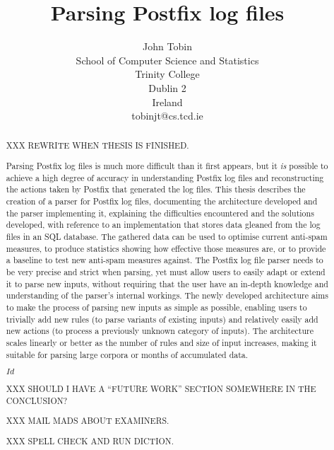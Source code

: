\documentclass[a4paper,12pt,draft]{report}
\begin{document}
\title{Parsing Postfix log files}
\author{John Tobin \\ School of Computer Science and Statistics \\
Trinity College \\ Dublin 2 \\ Ireland \\ tobinjt@cs.tcd.ie}
\maketitle

\begin{abstract}

    \setcounter{page}{2}

    XXX REWRITE WHEN THESIS IS FINISHED\@.

    Parsing Postfix log files is much more difficult than it first appears,
    but it \textit{is\/} possible to achieve a high degree of accuracy in
    understanding Postfix log files and reconstructing the actions taken by
    Postfix that generated the log files.  This thesis describes the
    creation of a parser for Postfix log files, documenting the
    architecture developed and the parser implementing it, explaining the
    difficulties encountered and the solutions developed, with reference to
    an implementation that stores data gleaned from the log files in an SQL
    database.  The gathered data can be used to optimise current anti-spam
    measures, to produce statistics showing how effective those measures
    are, or to provide a baseline to test new anti-spam measures against.
    The Postfix log file parser needs to be very precise and strict when
    parsing, yet must allow users to easily adapt or extend it to parse new
    inputs, without requiring that the user have an in-depth knowledge and
    understanding of the parser's internal workings.  The newly developed
    architecture aims to make the process of parsing new inputs as simple
    as possible, enabling users to trivially add new rules (to parse
    variants of existing inputs) and relatively easily add new actions (to
    process a previously unknown category of inputs).  The architecture
    scales linearly or better as the number of rules and size of input
    increases, making it suitable for parsing large corpora or months of
    accumulated data.

    \SVN$Id$
    \begin{center}
        \SVNId{}
    \end{center}

    XXX SHOULD I HAVE A ``FUTURE WORK'' SECTION SOMEWHERE IN THE
    CONCLUSION\@?

    XXX MAIL MADS ABOUT EXAMINERS\@.

    XXX SPELL CHECK AND RUN DICTION\@.

\end{abstract}
\end{document}
